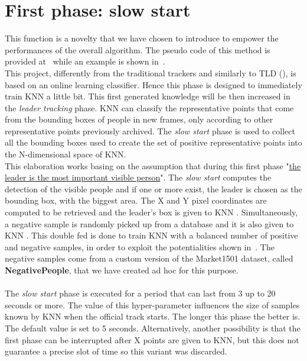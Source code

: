 \section{First phase: slow start} \label{sec:slowStartPhase}
This function is a novelty that we have chosen to introduce to empower the performances of the overall algorithm. The pseudo code of this method is provided at~ while an example is shown in~.\\
This project, differently from the traditional trackers and similarly to TLD (), is based on an online learning classifier. Hence this phase is designed to immediately train KNN a little bit. This first generated knowledge will be then increased in the \textit{leader tracking} phase. KNN can classify the representative points that come from the bounding boxes of people in new frames, only according to other representative points previously archived. The \textit{slow start} phase is used to collect all the bounding boxes used to create the set of positive representative points into the N-dimensional space of KNN.\\
This elaboration works basing on the assumption that during this first phase "\ul{the leader is the most important visible person}". The \textit{slow start} computes the detection of the visible people  and if one or more exist, the leader is chosen as the bounding box, with the biggest area. The X and Y pixel coordinates are computed to be retrieved  and the leader's box is given to KNN . Simultaneously, a negative sample is randomly picked up from a database and it is also given to KNN . This double fed is done to train KNN with a balanced number of positive and negative samples, in order to exploit the potentialities shown in~. The negative samples come from a custom version of the Market1501 dataset\cite{market1501}, called \textbf{NegativePeople}, that we have created ad hoc for this purpose.\\
\\
The \textit{slow start} phase is executed for a period that can last from 3 up to 20 seconds or more. The value of this hyper-parameter influences the size of samples known by KNN when the official track starts. The longer this phase the better is. The default value is set to 5 seconds. Alternatively, another possibility is that the first phase can be interrupted after X points are given to KNN, but this does not guarantee a precise slot of time so this variant was discarded.

